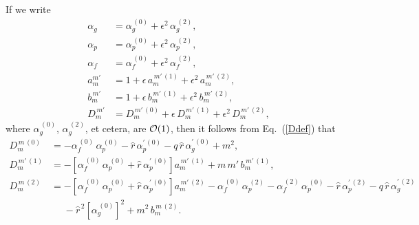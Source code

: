 \documentclass[12pt,prb,aps]{revtex4-1}
\begin{document}
If we write
\begin{align}
\alpha_g&= \alpha_g^{\,(0)} + \epsilon^2\,\alpha_g^{\,(2)},\\[0.5ex]
\alpha_p&= \alpha_p^{\,(0)} + \epsilon^2\,\alpha_p^{\,(2)},\\[0.5ex]
\alpha_f&= \alpha_f^{\,(0)} + \epsilon^2\,\alpha_f^{\,(2)},\\[0.5ex]
a_{m}^{m'} &= 1 + \epsilon\,a_m^{\,m'\,(1)} + \epsilon^2\,a_{m}^{\,m'\,(2)},\\[0.5ex]
b_{m}^{\,m'} &= 1 + \epsilon\,b_m^{\,m'\,(1)} + \epsilon^2\,b_{m}^{\,m'\,(2)},\\[0.5ex]
D_{m}^{\,m'} &= D_m^{\,m'\,(0)} + \epsilon\,D_m^{\,m'\,(1)} + \epsilon^2\,D_{m}^{\,m'\,(2)},
\end{align}
where $\alpha_g^{\,(0)}$, $\alpha_g^{\,(2)}$, et cetera, are ${\cal O}(1)$, 
then it follows from Eq.~(\ref{Ddef}) that
\begin{align}\label{e130}
D_m^{\,m\,(0)} &= -\alpha_f^{\,(0)}\,\alpha_p^{\,(0)} - \hat{r}\,\alpha_p^{\prime\,(0)} - q\,\hat{r}\,\alpha_g^{\prime\,(0)} + m^2,\\[0.5ex]
D_{m}^{\,m'\,(1)}&=   - \left[\alpha_f^{\,(0)}\,\alpha_p^{\,(0)} + \hat{r}\,\alpha_p^{\prime\,(0)}\right]a_m^{\,m'\,(1)} + m\,m'\,b_m^{\,m'\,(1)},\\[0.5ex]
D_{m}^{\,m\,(2)}&=  -\left[\alpha_f^{\,(0)}\,\alpha_p^{\,(0)} + \hat{r}\,\alpha_p^{\prime\,(0)}\right]a_m^{\,m'\,(2)} 
-\alpha_f^{\,(0)}\,\alpha_p^{\,(2)}-\alpha_f^{\,(2)}\,\alpha_p^{\,(0)}-\hat{r}\,\alpha_p^{\prime\,(2)} - q\,\hat{r}\,\alpha_g^{\prime\,(2)}\nonumber\\[0.5ex]&\phantom{=}
-\hat{r}^{\,2}\left[\alpha_g^{\,(0)}\right]^2+m^2\,b_m^{\,m\,(2)}.\label{e132}
\end{align}
\end{document}
